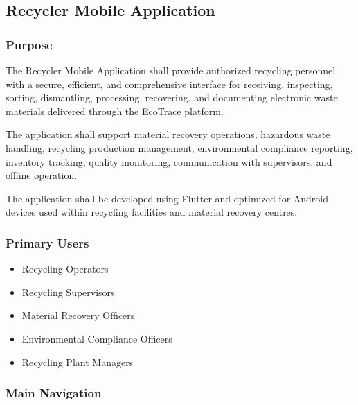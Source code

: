 \subsection{Recycler Mobile Application}

\subsubsection*{Purpose}

The Recycler Mobile Application shall provide authorized recycling
personnel with a secure, efficient, and comprehensive interface for
receiving, inspecting, sorting, dismantling, processing, recovering,
and documenting electronic waste materials delivered through the
EcoTrace platform.

The application shall support material recovery operations, hazardous
waste handling, recycling production management, environmental
compliance reporting, inventory tracking, quality monitoring,
communication with supervisors, and offline operation.

The application shall be developed using Flutter and optimized for
Android devices used within recycling facilities and material recovery
centres.


\subsubsection*{Primary Users}

\begin{itemize}

\item Recycling Operators

\item Recycling Supervisors

\item Material Recovery Officers

\item Environmental Compliance Officers

\item Recycling Plant Managers

\end{itemize}


\subsubsection*{Main Navigation}

